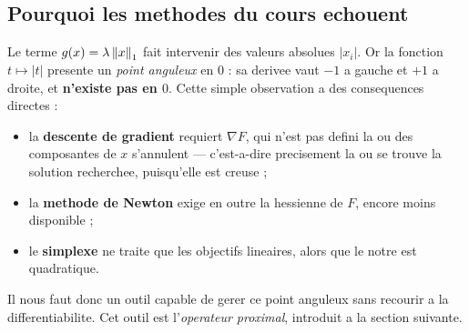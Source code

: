 \subsection{Pourquoi les methodes du cours echouent}
\label{subsec:echec}

Le terme $g(x) = \lambda\left\lVert x \right\rVert_1$ fait intervenir des valeurs absolues
$|x_i|$. Or la fonction $t \mapsto |t|$ presente un \emph{point anguleux} en
$0$ : sa derivee vaut $-1$ a gauche et $+1$ a droite, et \textbf{n'existe pas en
$0$}. Cette simple observation a des consequences directes :
\begin{itemize}
  \item la \textbf{descente de gradient} requiert $\nabla F$, qui n'est pas
        defini la ou des composantes de $x$ s'annulent --- c'est-a-dire
        precisement la ou se trouve la solution recherchee, puisqu'elle est
        creuse ;
  \item la \textbf{methode de Newton} exige en outre la hessienne de $F$, encore
        moins disponible ;
  \item le \textbf{simplexe} ne traite que les objectifs lineaires, alors que le
        notre est quadratique.
\end{itemize}
Il nous faut donc un outil capable de gerer ce point anguleux sans recourir a la
differentiabilite. Cet outil est l'\emph{operateur proximal}, introduit a la
section suivante.
